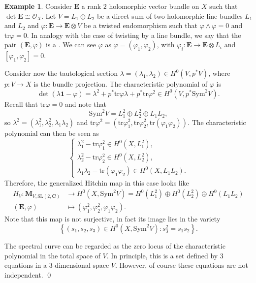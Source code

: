 \documentclass[12pt,a4paper]{book}
\theoremstyle{definition} \newtheorem{defn}[thm]{Definition}
\theoremstyle{definition} \newtheorem{ejemplo}[thm]{Example}
\theoremstyle{remark} \newtheorem{rem}[thm]{Remark}
\def\OO{\mathscr{O}}
\def\CC{\mathbf{C}}
\def\tr{\mathrm{tr}}
\def\id{\mathbf{1}}
\def\SL{\mathrm{SL}}
\def\Sym{\mathrm{Sym}}
\newcommand{\ve}[1]{\mathbf{#1}}
\let\emph\relax
\begin{document}
 \begin{ejemplo}
   Consider $\ve{E}$ a rank $2$  holomorphic vector bundle on $X$ such that $\det \ve{E} \cong \OO_X$. Let $V=L_1 \oplus L_2$ be a direct sum of two holomorphic line bundles $L_1$ and $L_2$ and $\varphi: \ve{E} \rightarrow \ve{E}\otimes V$ be a twisted endomorphism such that $\varphi \wedge \varphi = 0$ and $\tr \varphi =0$. In analogy with the case of twisting by a line bundle, we say that the pair $(\ve{E},\varphi)$ is a \emph{$V$-twisted $\SL(2,\CC)$-Higgs bundle}. We can see $\varphi$ as $\varphi=(\varphi_1,\varphi_2)$, with $\varphi_i:\ve{E} \rightarrow \ve{E} \otimes L_i$ and $[\varphi_1,\varphi_2]=0$. 
   
   Consider now the tautological section $\lambda=(\lambda_1,\lambda_2) \in H^0(V,p^*V)$, where $p:V\rightarrow X$ is the bundle projection. The characteristic polynomial of $\varphi$ is
   \begin{equation*}
     \det(\lambda \id -\varphi) = \lambda^2 + p^*\tr \varphi \lambda + p^* \tr \varphi^2 \in H^0(V,p^* \Sym^2 V).
   \end{equation*}
   Recall that $\tr \varphi=0$ and note that $$\Sym^2 V= L_1^2 \oplus L_2^2 \oplus L_1L_2, $$
   so $\lambda^2=(\lambda_1^2,\lambda_2^2, \lambda_1\lambda_2)$ and $\tr \varphi^2 = (\tr \varphi_1^2, \tr \varphi_2^2, \tr (\varphi_1 \varphi_2))$. The characteristic polynomial can then be seen as
   \begin{equation*}
     \begin{cases}
       \lambda_1^2-\tr \varphi_1^2 \in H^0(X,L_1^2), \\
       \lambda_2^2-\tr \varphi_2^2 \in H^0(X,L_2^2), \\
       \lambda_1 \lambda_2 - \tr(\varphi_1 \varphi_2) \in H^0(X,L_1L_2).
     \end{cases}
   \end{equation*}
   Therefore, the generalized Hitchin map in this case looks like
   \begin{align*}
     H_V :\mathbf{M}_{V,\SL(2,\CC)}&\longrightarrow H^0(X,\Sym^2 V) = H^0(L_1^2) \oplus H^0(L_2^2) \oplus H^0(L_1L_2)\\ 
     (\ve{E},\varphi) &\longmapsto (\varphi_1^2,\varphi_2^2,\varphi_1\varphi_2). 
     \end{align*}
     Note that this map is not surjective, in fact its image lies in the variety
     \begin{equation*}
       \left\{ (s_1,s_2,s_3) \in H^0(X,\Sym^2 V) : s_3^2 = s_1s_2 \right\}.
     \end{equation*}
     
     The spectral curve can be regarded as the zero locus of the characteristic polynomial in the total space of $V$. In principle, this is a set defined by 3 equations in a 3-dimensional space $V$. However, of course these equations are not independent.
   \qed
 \end{ejemplo}
\end{document}
